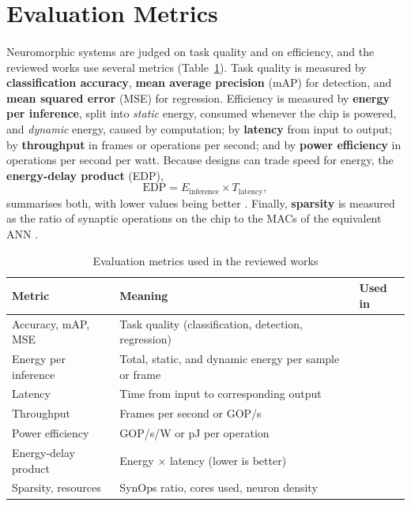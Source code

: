 \documentclass[12pt,a4paper,final]{extreport}
\begin{document}
\section{Evaluation Metrics}

\paragraph{} Neuromorphic systems are judged on task quality and on efficiency, and the reviewed works use several metrics (Table~\ref{tab:metrics}). Task quality is measured by \textbf{classification accuracy}, \textbf{mean average precision} (mAP) for detection, and \textbf{mean squared error} (MSE) for regression. Efficiency is measured by \textbf{energy per inference}, split into \emph{static} energy, consumed whenever the chip is powered, and \emph{dynamic} energy, caused by computation; by \textbf{latency} from input to output; by \textbf{throughput} in frames or operations per second; and by \textbf{power efficiency} in operations per second per watt. Because designs can trade speed for energy, the \textbf{energy-delay product} (EDP),
\begin{equation}
\mathrm{EDP}=E_{\mathrm{inference}}\times T_{\mathrm{latency}},
\end{equation}
summarises both, with lower values being better \cite{p1,p4}. Finally, \textbf{sparsity} is measured as the ratio of synaptic operations on the chip to the MACs of the equivalent ANN \cite{p4}.

{\renewcommand{\arraystretch}{1.15}
\begin{table}[htbp]
\centering
\caption{Evaluation metrics used in the reviewed works}\label{tab:metrics}
\small
\begin{tabularx}{\textwidth}{|p{3.6cm}|X|p{2.4cm}|}
\hline
\textbf{Metric} & \textbf{Meaning} & \textbf{Used in} \\ \hline
Accuracy, mAP, MSE & Task quality (classification, detection, regression) & \cite{p1,p3,p4} \\ \hline
Energy per inference & Total, static, and dynamic energy per sample or frame & \cite{p1,p3,p4} \\ \hline
Latency & Time from input to corresponding output & \cite{p1,p2,p3,p4} \\ \hline
Throughput & Frames per second or GOP/s & \cite{p2,p4} \\ \hline
Power efficiency & GOP/s/W or pJ per operation & \cite{p2} \\ \hline
Energy-delay product & Energy $\times$ latency (lower is better) & \cite{p1,p4} \\ \hline
Sparsity, resources & SynOps ratio, cores used, neuron density & \cite{p3,p4} \\ \hline
\end{tabularx}
\end{table}}
\end{document}
